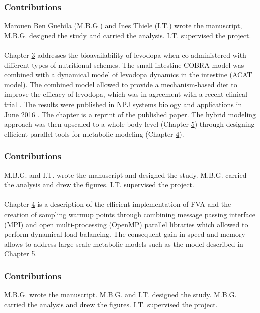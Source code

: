 \subsubsection{Contributions}
Marouen Ben Guebila (M.B.G.) and Ines Thiele (I.T.) wrote the manuscript, M.B.G. designed the study and carried the analysis. I.T. supervised the project.\\

\\
\noindent Chapter \hyperref[ch:chapter3]{3} addresses the bioavailability of levodopa when co-administered with different types of nutritional schemes. The small intestine COBRA model was combined with a dynamical model of levodopa dynamics in the intestine (ACAT model). The combined model allowed to provide a mechanism-based diet to improve the efficacy of levodopa, which was in agreement with a recent clinical trial \cite{nagashima2016effects} . The results were published in NPJ systems biology and applications in June 2016 \cite{guebila2016model}. The chapter is a reprint of the published paper. The hybrid modeling approach was then upscaled to a whole-body level (Chapter \hyperref[ch:chapter5]{5}) through designing efficient parallel tools for metabolic modeling (Chapter \hyperref[ch:chapter4]{4}). 
\subsubsection{Contributions}
M.B.G. and I.T. wrote the manuscript and designed the study. M.B.G. carried the analysis and drew the figures. I.T. supervised the project.\\

\\
\noindent Chapter \hyperref[ch:chapter4]{4} is a description of the efficient implementation of FVA and the creation of sampling warmup points through combining message passing interface (MPI) and open multi-processing (OpenMP) parallel libraries which allowed to perform dynamical load balancing. The consequent gain in speed and memory allows to address large-scale metabolic models such as the model described in Chapter \hyperref[ch:chapter5]{5}. 
\subsubsection{Contributions}
\noindent M.B.G. wrote the manuscript. M.B.G. and I.T. designed the study. M.B.G. carried the analysis and drew the figures. I.T. supervised the project.\\

